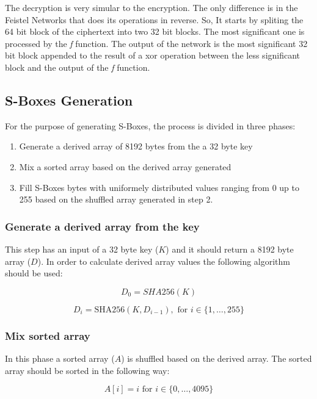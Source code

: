 \documentclass{article} %
\begin{document}
The decryption is very simular to the encryption. The only difference is in the Feistel Networks that does
its operations in reverse. So, It starts by spliting the 64 bit block of the ciphertext into two 32 bit blocks.
The most significant one is processed by the \textit{f} function.
The output of the network is the most significant 32 bit block appended to the result of a xor operation between 
the less significant block and the output of the \textit{f} function.

\subsection{S-Boxes Generation}
\label{sboxgen}
For the purpose of generating S-Boxes, the process is divided in three phases:
\begin{enumerate}
  \item Generate a derived array of 8192 bytes from the a 32 byte key
  \item Mix a sorted array based on the derived array generated
  \item Fill S-Boxes bytes with uniformely distributed values ranging from 0 up to 255 based on the shuffled array generated in step 2. 
\end{enumerate}

\subsubsection{Generate a derived array from the key}
This step has an input of a 32 byte key ($K$) and it should return a 8192 byte array ($D$).
In order to calculate derived array values the following algorithm should be used:

\begin{equation}
  D_0 = SHA256(K)
\end{equation}

\begin{equation}
  D_i = \text{SHA256}(K, D_{i-1}), \text{ for } i \in \{1, \ldots, 255\}
\end{equation}

\subsubsection{Mix sorted array}
In this phase a sorted array ($A$) is shuffled based on the derived array.
The sorted array should be sorted in the following way:

\begin{equation}
  A[i] = i \text{ for } i \in \{0, \ldots, 4095\}
\end{equation}
\end{document}
